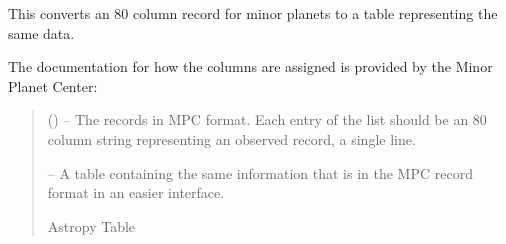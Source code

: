 \documentclass[letterpaper,11pt,english]{sphinxmanual}
\begin{document}
\begin{savenotes}\begin{fulllineitems}
\label{\detokenize{code/opihiexarata.library.mpcrecord:opihiexarata.library.mpcrecord.minor_planet_record_to_table}}
\pysigstartsignatures
{}
\pysigstopsignatures
\sphinxAtStartPar
This converts an 80 column record for minor planets to a table
representing the same data.

\sphinxAtStartPar
The documentation for how the columns are assigned is provided by the
Minor Planet Center:
\begin{quote}\begin{description}
\sphinxAtStartPar
{} () – The records in MPC format. Each entry of the list should be an 80
column string representing an observed record, a single line.

\sphinxAtStartPar
{} – A table containing the same information that is in the MPC record
format in an easier interface.

\sphinxAtStartPar
Astropy Table

\end{description}\end{quote}

\end{fulllineitems}\end{savenotes}

\end{document}
